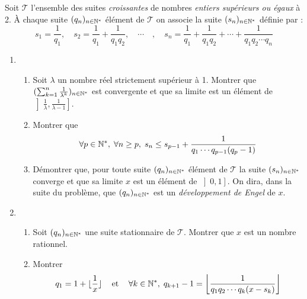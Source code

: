 
Soit $\mathcal{T}$ l'ensemble des suites \emph{croissantes} de nombres \emph{entiers sup{\'e}rieurs ou {\'e}gaux} {\`a} 2.\newline
\`A chaque suite $(q_n)_{n\in \mathbb{N}^{*}}$ {\'e}l{\'e}ment de $\mathcal{T}$ on associe la suite $(s_n)_{n\in \mathbb{N}^{*}}$ d{\'e}finie par :
\[
s_1=\frac 1{q_1},\quad s_2=\frac 1{q_1}+\frac 1{q_1q_2},\quad \cdots \quad,\quad s_n=\frac 1{q_1}+\frac 1{q_1q_2}+\cdots +\frac 1{q_1q_2\cdots q_n}
\]
\begin{enumerate}
\item  
\begin{enumerate}
  \item Soit $\lambda $ un nombre r{\'e}el strictement sup{\'e}rieur {\`a} 1. Montrer que $(\sum_{k=1}^{n}\frac{1}{\lambda ^{k}})_{n\in \mathbb{N}^*}$ est convergente et que sa limite est un {\'e}l{\'e}ment de $\left] \frac{1}{\lambda },\frac{1}{\lambda -1}\right] $.
  
  \item Montrer que 
\begin{displaymath}
\forall p \in \mathbb{N}^*, \; \forall n \geq p, \;
s_n \leq s_{p-1} + \frac{1}{q_1\cdots q_{p-1}(q_p - 1)}
\end{displaymath}

  \item D{\'e}montrer que, pour toute suite $(q_{n})_{n\in \mathbb{N}^{*}}$ {\'e}l{\'e}ment de $\mathcal{T}$ la suite $(s_{n})_{n\in \mathbb{N}^{*}}$ converge et que sa limite $x$ est un {\'e}l{\'e}ment de $\left] 0,1\right]$. On dira, dans la suite du problème, que $(q_{n})_{n\in \mathbb{N}^{*}}$ est un \emph{développement de Engel} de $x$.
\end{enumerate}
 
\item \begin{enumerate} 
\item Soit $(q_{n})_{n\in \mathbb{N}^{*}}$ une suite stationnaire de $\mathcal{T}$. Montrer que $x$ est un nombre rationnel.
\item Montrer
\begin{displaymath}
q_{1}=1 + \lfloor \frac{1}{x}\rfloor \hspace{0.3cm} \text{ et } \hspace{0.3cm} \forall k\in \mathbb{N}^*,\;q_{k+1}-1 = \left \lfloor \frac{1}{q_{1}q_{2}\cdots q_{k}(x-s_{k})} \right\rfloor
\end{displaymath}
\end{enumerate}


\end{enumerate}
